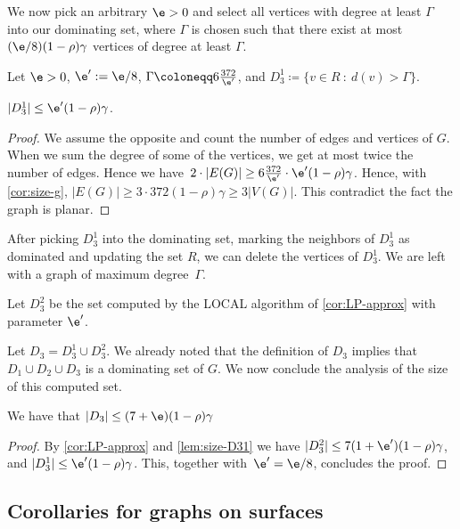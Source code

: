 We now pick an arbitrary $\e>0$ and select all vertices with degree at least
$\Gamma$ into our
dominating set, where $\Gamma$ is chosen such that there exist at
most $(\e/8)(1-\rho)\gamma$ vertices of degree at least $\Gamma$.

\begin{tcolorbox}[colback=red!5!white,colframe=red!50!black]
  Let $\e>0$, $\e':= \e/8$,
  $\Gamma\coloneqq 6\frac{372}{\e'}$, and \quad
  $D_3^1\coloneqq \{v\in R ~:~ d(v)>\Gamma\}$.
\end{tcolorbox}

\begin{lemma}\label{lem:size-D31}
  $|D_3^1|\le \e'(1-\rho)\gamma$.
\end{lemma}
\begin{proof}
  We assume the opposite and count the number of edges and vertices of $G$.
  When we sum the degree of some of the vertices, we get at most twice the
  number of edges.
  Hence we have~$2\cdot |E(G)|\ge 6\frac{372}{\e'} \cdot \e'(1-\rho)\gamma$.
  Hence, with \cref{cor:size-g},
  $|E(G)|\ge 3\cdot 372(1-\rho)\gamma\geq 3|V(G)|$. This
  contradict the fact the graph is planar.
\end{proof}

After picking $D_3^1$ into the dominating set, marking the neighbors of
$D_3^1$ as dominated and updating the set $R$, we can delete the
vertices of $D_3^1$. We are left with a graph of maximum degree~$\Gamma$.

\begin{tcolorbox}[colback=red!5!white,colframe=red!50!black]
  Let $D_3^2$ be the set computed by the LOCAL algorithm of \cref{cor:LP-approx}
  with parameter $\e'$.
\end{tcolorbox}

Let $D_3=D_3^1 \cup D_3^2$. We already noted that the definition of $D_3$ implies that
$D_1\cup D_2\cup D_3$ is a dominating set of $G$. We now conclude the
analysis of the size of this computed set.

\begin{lemma}\label{lem:D3-LP}
  We have that $|D_3| \le (7+\e)(1-\rho)\gamma$
\end{lemma}
\begin{proof}
  By \cref{cor:LP-approx} and \cref{lem:size-D31} we have
  $|D_3^2|\leq 7(1+\e')(1-\rho)\gamma$, and $|D_3^1|\le \e'(1-\rho)\gamma$.
  This, together with~$\e'=\e/8$, concludes the proof.
\end{proof}

\subsection{Corollaries for graphs on surfaces}

